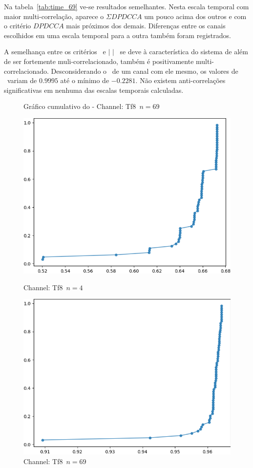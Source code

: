  Na tabela~\ref{tab:time_69} ve-se resultados semelhantes. Nesta escala temporal com maior multi-correlação, aparece o $\Sigma DPDCCA$ um pouco acima dos outros e com o critério $DPDCCA$ mais próximos dos demais. Diferenças entre os canais escolhidos em uma escala temporal para a outra também foram registrados.

  A semelhança entre os critérios \pdcca~e $|$ \pdcca $|$~ se deve à característica do sistema de além de ser fortemente muli-correlacionado, também é positivamente multi-correlacionado. Desconsiderando o \pdcca~de um canal com ele mesmo, os valores de \pdcca~variam de $0.9995$ até o mínimo de $-0.2281$. Não existem anti-correlações significativas em nenhuma das escalas temporais calculadas.
  
  \begin{figure}[ht]
  \caption{Gráfico cumulativo do \dmc - Channel: Tf8~$n = 69$}
  \begin{minipage}[b]{0.45\textwidth}
    \includegraphics[width=\textwidth]{../Figures/test_dmc/pdcca_of_T8.._n_4.png}
    \caption{Channel: Tf8~$n = 4$}
  \end{minipage}
  \hfill
  \begin{minipage}[b]{0.45\textwidth}
    \includegraphics[width=\textwidth]{../Figures/test_dmc/pdcca_of_T8.._n_69.png}
    \caption{Channel: Tf8~$n = 69$}
  \end{minipage}
\end{figure}

